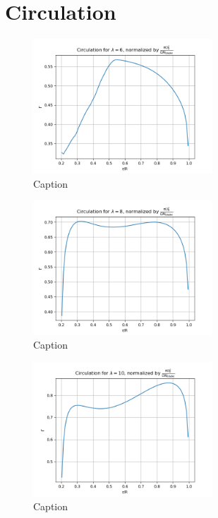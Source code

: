 \section{Circulation}
\begin{figure}[H]
    \centering
    \includegraphics[width=0.6\textwidth]{Figures/Circulation_6.png}
    \caption{Caption}
    \label{fig:enter-label}
\end{figure}
\begin{figure}[H]
    \centering
    \includegraphics[width=0.6\textwidth]{Figures/Circulation_8.png}
    \caption{Caption}
    \label{fig:enter-label}
\end{figure}
\begin{figure}[H]
    \centering
    \includegraphics[width=0.6\textwidth]{Figures/Circulation_10.png}
    \caption{Caption}
    \label{fig:enter-label}
\end{figure}

